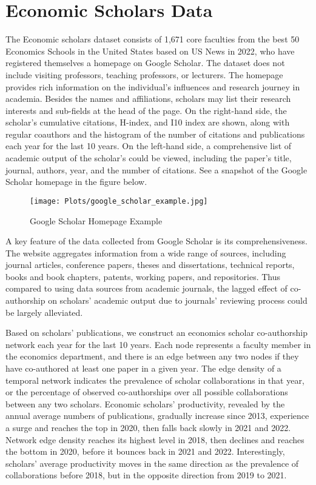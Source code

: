 \section{Economic Scholars Data}

The Economic scholars dataset consists of 1,671 core faculties from the best 50 Economics Schools in the United States based on US News in 2022, who have registered themselves a homepage on Google Scholar. The dataset does not include visiting professors, teaching professors, or lecturers. The homepage provides rich information on the individual's influences and research journey in academia. Besides the names and affiliations, scholars may list their research interests and sub-fields at the head of the page. On the right-hand side, the scholar's cumulative citations, H-index, and I10 index are shown, along with regular coauthors and the histogram of the number of citations and publications each year for the last 10 years. On the left-hand side, a comprehensive list of academic output of the scholar's could be viewed, including the paper's title, journal, authors, year, and the number of citations. See a snapshot of the Google Scholar homepage in the figure below.

\begin{figure}[!htbp]
  \caption{Google Scholar Homepage Example}
  \centering
  \texttt{[image: Plots/google\_scholar\_example.jpg]}
\end{figure}

A key feature of the data collected from Google Scholar is its comprehensiveness. The website aggregates information from a wide range of sources, including journal articles, conference papers, theses and dissertations, technical reports, books and book chapters, patents, working papers, and repositories. Thus compared to using data sources from academic journals, the lagged effect of co-authorship on scholars' academic output due to journals' reviewing process could be largely alleviated.

Based on scholars' publications, we construct an economics scholar co-authorship network each year for the last 10 years. Each node represents a faculty member in the economics department, and there is an edge between any two nodes if they have co-authored at least one paper in a given year. The edge density of a temporal network indicates the prevalence of scholar collaborations in that year, or the percentage of observed co-authorships over all possible collaborations between any two scholars. Economic scholars' productivity, revealed by the annual average numbers of publications, gradually increase since 2013, experience a surge and reaches the top in 2020, then falls back slowly in 2021 and 2022. Network edge density reaches its highest level in 2018, then declines and reaches the bottom in 2020, before it bounces back in 2021 and 2022. Interestingly, scholars' average productivity moves in the same direction as the prevalence of collaborations before 2018, but in the opposite direction from 2019 to 2021.

